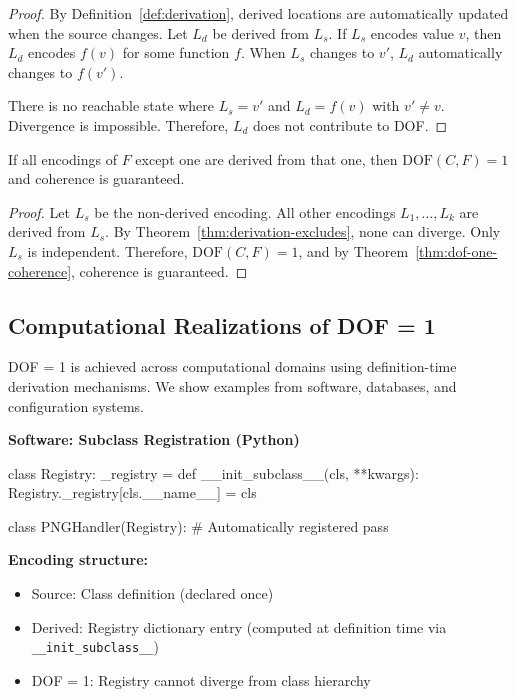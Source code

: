 \begin{proof}
By Definition~\ref{def:derivation}, derived locations are automatically updated when the source changes. Let $L_d$ be derived from $L_s$. If $L_s$ encodes value $v$, then $L_d$ encodes $f(v)$ for some function $f$. When $L_s$ changes to $v'$, $L_d$ automatically changes to $f(v')$.

There is no reachable state where $L_s = v'$ and $L_d = f(v)$ with $v' \neq v$. Divergence is impossible. Therefore, $L_d$ does not contribute to DOF.
\end{proof}

\begin{corollary}\label{cor:metaprogramming}
If all encodings of $F$ except one are derived from that one, then $\text{DOF}(C, F) = 1$ and coherence is guaranteed.
\end{corollary}

\begin{proof}
Let $L_s$ be the non-derived encoding. All other encodings $L_1, \ldots, L_k$ are derived from $L_s$. By Theorem~\ref{thm:derivation-excludes}, none can diverge. Only $L_s$ is independent. Therefore, $\text{DOF}(C, F) = 1$, and by Theorem~\ref{thm:dof-one-coherence}, coherence is guaranteed.
\end{proof}

\subsection{Computational Realizations of DOF = 1}\label{sec:ssot-patterns}

DOF = 1 is achieved across computational domains using definition-time derivation mechanisms. We show examples from software, databases, and configuration systems.

\textbf{Software: Subclass Registration (Python)}

\begin{code}
class Registry:
    _registry = {}
    def __init_subclass__(cls, **kwargs):
        Registry._registry[cls.__name__] = cls

class PNGHandler(Registry):  # Automatically registered
    pass
\end{code}

\textbf{Encoding structure:}
\begin{itemize}
\tightlist
\item Source: Class definition (declared once)
\item Derived: Registry dictionary entry (computed at definition time via \texttt{\_\_init\_subclass\_\_})
\item DOF = 1: Registry cannot diverge from class hierarchy
\end{itemize}

